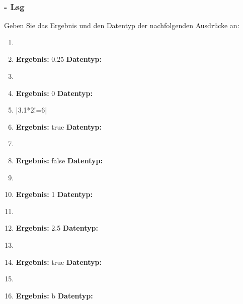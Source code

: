 \begin{frame}[t]%
    \frametitle{\stitle - Lsg}
Geben Sie das Ergebnis und den Datentyp der nachfolgenden Ausdrücke an:
\begin{enumerate}
\item {}
\item[] {\bf Ergebnis: } 0.25 \hfill {\bf Datentyp: } 

\item {}
\item[] {\bf Ergebnis: } 0 \hfill {\bf Datentyp: } 

\item \code|3.1*2!=6|
\item[] {\bf Ergebnis: } true \hfill {\bf Datentyp: } 

\item {}
\item[] {\bf Ergebnis: } false \hfill {\bf Datentyp: } 

\item {}
\item[] {\bf Ergebnis: } 1 \hfill {\bf Datentyp: } 

\item {}
\item[] {\bf Ergebnis: } 2.5 \hfill {\bf Datentyp: } 

\item {}
\item[] {\bf Ergebnis: } true \hfill {\bf Datentyp: } 

\item {}
\item[] {\bf Ergebnis: } b \hfill {\bf Datentyp: } 
\end{enumerate}
\end{frame}
